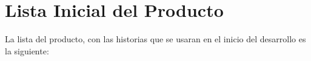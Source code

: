 \section{Lista Inicial del Producto}

La lista del producto, con las historias que se usaran en el inicio del desarrollo es la siguiente:\\




\newpage

\newpage

\newpage

\newpage

\newpage

\newpage

\newpage

\newpage
